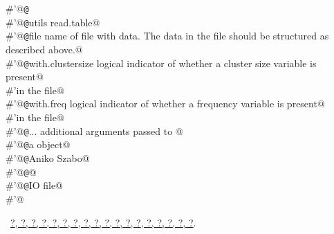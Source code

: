 \documentclass[reqno]{amsart}
\renewcommand{\NWlink}[2]{\hyperlink{#1}{#2}}
\begin{document}
\begin{flushleft}
\begin{minipage}{\linewidth}
\begin{list}{}{}
\mbox{}\verb@#'@{\tt @}\verb@export@\\
\mbox{}\verb@#'@{\tt @}\verb@importFrom utils read.table@\\
\mbox{}\verb@#'@{\tt @}\verb@param file name of file with data. The data in the file should be structured as described above.@\\
\mbox{}\verb@#'@{\tt @}\verb@param with.clustersize logical indicator of whether a cluster size variable is present@\\
\mbox{}\verb@#'in the file@\\
\mbox{}\verb@#'@{\tt @}\verb@param with.freq logical indicator of whether a frequency variable is present@\\
\mbox{}\verb@#'in the file@\\
\mbox{}\verb@#'@{\tt @}\verb@param ... additional arguments passed to @\\
\mbox{}\verb@#'@{\tt @}\verb@return a  object@\\
\mbox{}\verb@#'@{\tt @}\verb@author Aniko Szabo@\\
\mbox{}\verb@#'@{\tt @}\verb@seealso {}@\\
\mbox{}\verb@#'@{\tt @}\verb@keywords IO file@\\
\mbox{}\verb@#'@\\
\mbox{}\verb@@{\NWsep}
\end{list}
\vspace{-1.5ex}
\footnotesize
\begin{list}{}{\setlength{\itemsep}{-\parsep}\setlength{\itemindent}{-\leftmargin}}
\item \NWtxtFileDefBy\ \NWlink{nuweb?}{?}\NWlink{nuweb?}{, ?}\NWlink{nuweb?}{, ?}\NWlink{nuweb?}{, ?}\NWlink{nuweb?}{, ?}\NWlink{nuweb?}{, ?}\NWlink{nuweb?}{, ?}\NWlink{nuweb?}{, ?}\NWlink{nuweb?}{, ?}\NWlink{nuweb?}{, ?}\NWlink{nuweb?}{, ?}\NWlink{nuweb?}{, ?}\NWlink{nuweb?}{, ?}\NWlink{nuweb?}{, ?}\NWlink{nuweb?}{, ?}\NWlink{nuweb?}{, ?}\NWlink{nuweb?}{, ?}\NWlink{nuweb?}{, ?}.

\item{}
\end{list}
\end{minipage}\vspace{4ex}
\end{flushleft}
\end{document}
